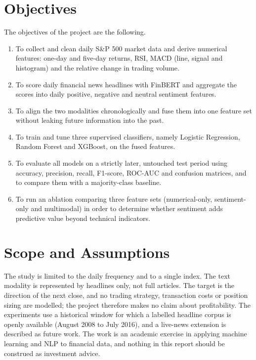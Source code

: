 \section{Objectives}
The objectives of the project are the following.
\begin{enumerate}
  \item To collect and clean daily S\&P 500 market data and derive numerical features: one-day and five-day returns, RSI, MACD (line, signal and histogram) and the relative change in trading volume.
  \item To score daily financial news headlines with FinBERT and aggregate the scores into daily positive, negative and neutral sentiment features.
  \item To align the two modalities chronologically and fuse them into one feature set without leaking future information into the past.
  \item To train and tune three supervised classifiers, namely Logistic Regression, Random Forest and XGBoost, on the fused features.
  \item To evaluate all models on a strictly later, untouched test period using accuracy, precision, recall, F1-score, ROC-AUC and confusion matrices, and to compare them with a majority-class baseline.
  \item To run an ablation comparing three feature sets (numerical-only, sentiment-only and multimodal) in order to determine whether sentiment adds predictive value beyond technical indicators.
\end{enumerate}

\section{Scope and Assumptions}
The study is limited to the daily frequency and to a single index. The text modality is represented by headlines only, not full articles. The target is the direction of the next close, and no trading strategy, transaction costs or position sizing are modelled; the project therefore makes no claim about profitability. The experiments use a historical window for which a labelled headline corpus is openly available (August 2008 to July 2016), and a live-news extension is described as future work. The work is an academic exercise in applying machine learning and NLP to financial data, and nothing in this report should be construed as investment advice.

